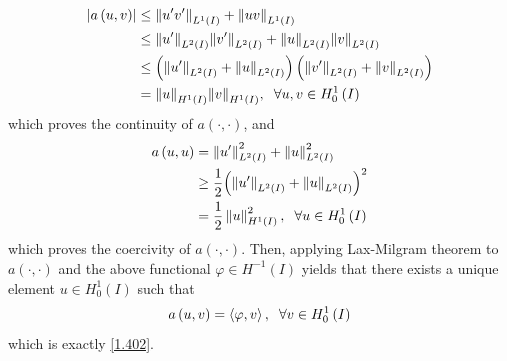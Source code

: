 \documentclass[a4paper,oneside]{book}
\numberwithin{equation}{chapter}
\begin{document}
\begin{align}
\left| {a\left( {u,v} \right)} \right| &\le {\left\| {u'v'} \right\|_{{L^1}\left( I \right)}} + {\left\| {uv} \right\|_{{L^1}\left( I \right)}}\\
 &\le {\left\| {u'} \right\|_{{L^2}\left( I \right)}}{\left\| {v'} \right\|_{{L^2}\left( I \right)}} + {\left\| u \right\|_{{L^2}\left( I \right)}}{\left\| v \right\|_{{L^2}\left( I \right)}}\\
& \le \left( {{{\left\| {u'} \right\|}_{{L^2}\left( I \right)}} + {{\left\| u \right\|}_{{L^2}\left( I \right)}}} \right)\left( {{{\left\| {v'} \right\|}_{{L^2}\left( I \right)}} + {{\left\| v \right\|}_{{L^2}\left( I \right)}}} \right)\\
& = {\left\| u \right\|_{{H^1}\left( I \right)}}{\left\| v \right\|_{{H^1}\left( I \right)}},\hspace{0.2cm}\forall u,v \in H_0^1\left( I \right)
\end{align}
which proves the continuity of $a\left( { \cdot , \cdot } \right)$, and
\begin{align}
a\left( {u,u} \right) &= \left\| {u'} \right\|_{{L^2}\left( I \right)}^2 + \left\| u \right\|_{{L^2}\left( I \right)}^2\\
& \ge \frac{1}{2}{\left( {{{\left\| {u'} \right\|}_{{L^2}\left( I \right)}} + {{\left\| u \right\|}_{{L^2}\left( I \right)}}} \right)^2}\\
& = \frac{1}{2}\left\| u \right\|_{{H^1}\left( I \right)}^2,\hspace{0.2cm}\forall u \in H_0^1\left( I \right)
\end{align}
which proves the coercivity of $a\left( { \cdot , \cdot } \right)$. Then, applying Lax-Milgram theorem to $a\left( { \cdot , \cdot } \right)$ and the above functional $\varphi \in H^{-1}\left(I\right)$ yields that there exists a unique element $u\in H_0^1\left(I\right)$ such that
\begin{align}
a\left( {u,v} \right) = \left\langle {\varphi ,v} \right\rangle ,\hspace{0.2cm}\forall v \in H_0^1\left( I \right)
\end{align}
which is exactly \eqref{1.402}. 
\end{document}
